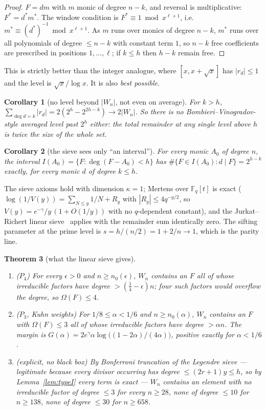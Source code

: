 \documentclass[10pt]{article}
\theoremstyle{plain}
\newtheorem{theorem}{Theorem}[section]
\newtheorem{corollary}[theorem]{Corollary}
\theoremstyle{definition}
\newcommand{\F}{\mathbb F}
\begin{document}
\begin{proof}
$F=dm$ with $m$ monic of degree $n-k$, and reversal is multiplicative:
$F^*=d^*m^*$. The window condition is $F^*\equiv1\bmod x^{\ell+1}$, i.e.\
$m^*\equiv(d^*)^{-1}\bmod x^{\ell+1}$. As $m$ runs over monics of degree $n-k$,
$m^*$ runs over all polynomials of degree $\le n-k$ with constant term $1$, so
$n-k$ free coefficients are prescribed in positions $1,\dots,\ell$; if
$k\le h$ then $h-k$ remain free.
\end{proof}

This is strictly better than the integer analogue, where $[x,x+\sqrt x]$ has
$|r_d|\le1$ and the level is $\sqrt x/\log x$. It is also \emph{best possible}.

\begin{corollary}[no level beyond $|W_n|$, not even on average]\label{cor:nolevel}
For $k>h$, $\sum_{\deg d=k}|r_d|=2(2^h-2^{2h-k})\to2|W_n|$. So there is no
Bombieri--Vinogradov-style averaged level past $2^h$ either: the total
remainder at any single level above $h$ is twice the size of the whole set.
\end{corollary}

\begin{corollary}[the sieve sees only ``an interval'']\label{cor:unif}
For \emph{every} monic $A_0$ of degree $n$, the interval
$I(A_0)=\{F:\deg(F-A_0)<h\}$ has $\#\{F\in I(A_0):d\mid F\}=2^{h-k}$ exactly,
for every monic $d$ of degree $k\le h$.
\end{corollary}

The sieve axioms hold with dimension $\kappa=1$; Mertens over $\F_q[t]$ is
exact ($\log(1/V(y))=\sum_{N\le y}1/N+R_y$ with $|R_y|\le4q^{-y/2}$, so
$V(y)=e^{-\gamma}/y\,(1+O(1/y))$ with no $q$-dependent constant), and the
Jurkat--Richert linear sieve~\cite{FI} applies with the remainder sum
identically zero. The sifting parameter at the prime level is
$s=h/(n/2)=1+2/n\to1$, which is the parity line.

\begin{theorem}[what the linear sieve gives]\label{thm:sieveout}
\mbox{}
\begin{enumerate}[label=(\alph*)]
\item ($P_4$) For every $\epsilon>0$ and $n\ge n_0(\epsilon)$, $W_n$ contains an
$F$ all of whose irreducible factors have degree $>(\tfrac14-\epsilon)n$; four
such factors would overflow the degree, so $\Omega(F)\le4$.
\item ($P_3$, Kuhn weights) For $1/8\le\alpha<1/6$ and $n\ge n_0(\alpha)$,
$W_n$ contains an $F$ with $\Omega(F)\le3$ all of whose irreducible factors
have degree $>\alpha n$. The margin is
$G(\alpha)=2e^{\gamma}\alpha\log\bigl((1-2\alpha)/(4\alpha)\bigr)$, positive
exactly for $\alpha<1/6$.
\item (explicit, no black box) By Bonferroni truncation of the Legendre sieve
--- legitimate because every divisor occurring has degree $\le(2r+1)y\le h$, so
by Lemma~\ref{lem:typeI} \emph{every} term is exact --- $W_n$ contains an
element with no irreducible factor of degree $\le3$ for every $n\ge28$, none of
degree $\le10$ for $n\ge138$, none of degree $\le30$ for $n\ge658$.
\end{enumerate}
\end{theorem}
\end{document}
